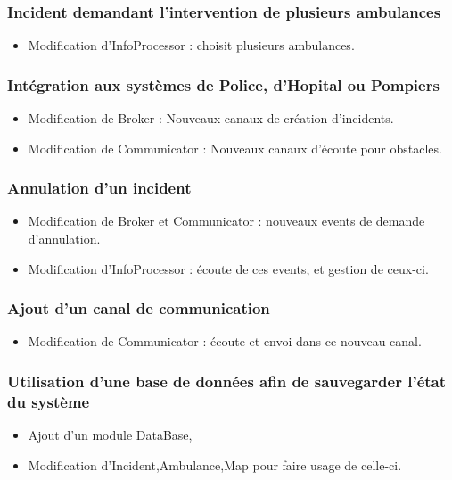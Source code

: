 	\subsubsection{Incident demandant l'intervention de plusieurs ambulances}
		\begin{itemize}
			\item Modification d'InfoProcessor : choisit plusieurs ambulances.
		\end{itemize}
	\subsubsection{Intégration aux systèmes de Police, d'Hopital ou Pompiers }
		\begin{itemize}
			\item Modification de Broker : Nouveaux canaux de création d'incidents.
			\item Modification de Communicator : Nouveaux canaux d'écoute pour obstacles.
		\end{itemize}
	\subsubsection{Annulation d'un incident}
		\begin{itemize}
			\item Modification de Broker et Communicator : nouveaux events de
			 	demande d'annulation.
			\item Modification d'InfoProcessor : écoute de ces events, et
				gestion de ceux-ci.
		\end{itemize}
	\subsubsection{Ajout d'un canal de communication}
		\begin{itemize}
			\item Modification de Communicator : écoute et envoi dans ce nouveau canal.
		\end{itemize}
	\subsubsection{Utilisation d'une base de données afin de sauvegarder l'état du système}
		\begin{itemize}
			\item Ajout d'un module DataBase,
			\item Modification d'Incident,Ambulance,Map pour faire usage de celle-ci.
		\end{itemize}
